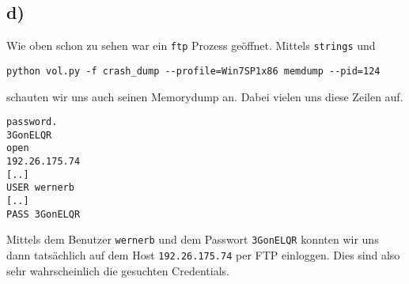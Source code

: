\documentclass[10pt,a4paper]{article}
\begin{document}
\subsection*{d)}
Wie oben schon zu sehen war ein \texttt{ftp} Prozess geöffnet. Mittels \texttt{strings} und
\begin{verbatim}
python vol.py -f crash_dump --profile=Win7SP1x86 memdump --pid=124
\end{verbatim}
schauten wir uns auch seinen Memorydump an. Dabei vielen uns diese Zeilen auf.
\begin{verbatim}
password.
3GonELQR
open
192.26.175.74
[..]
USER wernerb
[..]
PASS 3GonELQR
\end{verbatim}
Mittels dem Benutzer \texttt{wernerb} und dem Passwort \texttt{3GonELQR} konnten wir uns dann tatsächlich auf dem Host \texttt{192.26.175.74} per FTP einloggen. Dies sind also sehr wahrscheinlich die gesuchten Credentials.
\end{document}
